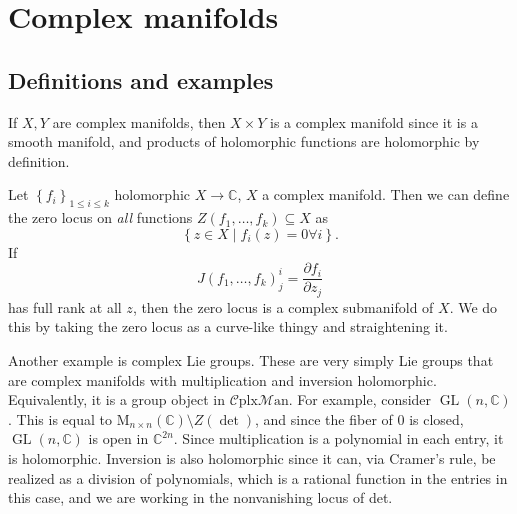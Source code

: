 \chapter{Complex manifolds}

\section{Definitions and examples}


\begin{example}\label{2.1.1}
	If $X,Y$ are complex manifolds, then $X\times Y$ is a complex manifold since it is a smooth manifold, and products of holomorphic functions are holomorphic by definition.

	Let $\left\{ f_i \right\} _{1\leq i\leq k} $ holomorphic $X\to \mathbb{C} $, $X$  a complex manifold. Then we can define the zero locus on \emph{all} functions $Z(f_1, \ldots ,f_k)\subseteq X$ as
	\[
		\left\{ z\in X\mid f_i(z)=0\forall i \right\} 
	.\]
	If
	\[
		J(f_1, \ldots ,f_k)^i_j= \frac{\partial f_i}{\partial z_j} 
	\]
	has full rank at all $z$, then the zero locus is a complex submanifold of $X$. We do this by taking the zero locus as a curve-like thingy and straightening it.

	Another example is complex Lie groups. These are very simply Lie groups that are complex manifolds with multiplication and inversion holomorphic. Equivalently, it is a group object in $\mathcal{C} \mathrm{plx} \mathcal{M} \mathrm{an} $. For example, consider $\operatorname{GL} (n,\mathbb{C} )$. This is equal to $\mathrm{M}_{n\times n} (\mathbb{C} )\setminus Z(\det )$, and since the fiber of 0 is closed, $\operatorname{GL} (n,\mathbb{C} )$ is open in $\mathbb{C} ^{2n} $. Since multiplication is a polynomial in each entry, it is holomorphic. Inversion is also holomorphic since it can, via Cramer's rule, be realized as a division of polynomials, which is a rational function in the entries in this case, and we are working in the nonvanishing locus of det.


\end{example}
